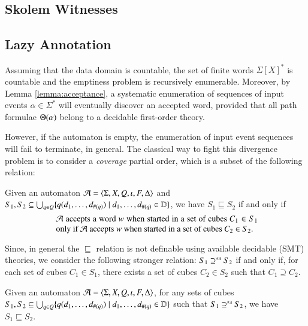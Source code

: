 \documentclass{llncs}
\begin{document}
\begin{lemma}\label{lemma:lyndon-existence}
  
\end{lemma}

\subsection{Skolem Witnesses} 

\subsection{Lazy Annotation} 


Assuming that the data domain is countable, the set of finite words
$\Sigma[X]^*$ is countable and the emptiness problem is recursively
enumerable. Moreover, by Lemma \ref{lemma:acceptance}, a systematic
enumeration of sequences of input events $\alpha \in \Sigma^*$ will
eventually discover an accepted word, provided that all path formulae
$\Theta({\alpha})$ belong to a decidable first-order theory.




However, if the automaton is empty, the enumeration of input event
sequences will fail to terminate, in general. The classical way to
fight this divergence problem is to consider a \emph{coverage} partial
order, which is a subset of the following relation: 

\begin{definition}\label{def:coverage}
  Given an automaton $\mathcal{A} = \langle \Sigma,X,Q,\iota,F,\Delta \rangle$ and
  $S_1, S_2 \subseteq \bigcup_{q \in Q} \{ q(d_1,\ldots,d_{\#(q)})
    \mid d_1,\ldots,d_{\#(q)} \in \mathbb{D} \}$, we have $S_1 \sqsubseteq
  S_2$ if and only if 
  \begin{equation}\label{eq:po}
    \text{
      \begin{minipage}{0.7\textwidth}
        $\A$ accepts a word $w$ when started in a set of cubes $C_1
        \in S_1$ only if $\A$ accepts $w$ when started in a set of
        cubes $C_2 \in S_2$.
    \end{minipage}} 
  \end{equation}
\end{definition}
Since, in general the $\sqsubseteq$ relation is not definable using
available decidable (SMT) theories, we consider the following stronger
relation: $S_1 \supseteq^{\scriptscriptstyle\forall\exists} S_2$ if and only if, for each set of cubes
$C_1 \in S_1$, there exists a set of cubes $C_2 \in S_2$ such that
$C_1 \supseteq C_2$.

\begin{lemma}\label{lemma:coverage}
  Given an automaton $\mathcal{A} = \langle \Sigma,X,Q,\iota,F,\Delta \rangle$, for any
  sets of cubes $S_1, S_2 \subseteq \bigcup_{q \in Q}
  \{ q(d_1,\ldots,d_{\#(q)}) \mid d_1,\ldots,d_{\#(q)} \in \mathbb{D} \}$
  such that $S_1 \supseteq^{\scriptscriptstyle\forall\exists} S_2$, we have $S_1 \sqsubseteq S_2$.
\end{lemma}
\proof{  
\qed}

 

\end{document}
